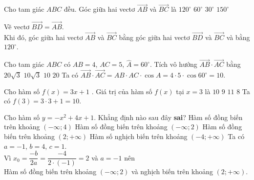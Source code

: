 \begin{ex}%
Cho tam giác $ABC$ đều. Góc giữa hai vectơ $\overrightarrow{AB}$ và $\overrightarrow{BC}$ là
\choice
{\True $120^\circ$}
{$60^\circ$}
{$30^\circ$}
{$150^\circ$}
\loigiai
{\begin{center}
\end{center}
Vẽ vectơ $\overrightarrow{BD}=\overrightarrow{AB}$.\\
Khi đó, góc giữa hai vectơ $\overrightarrow{AB}$ và $\overrightarrow{BC}$ bằng góc giữa hai vectơ $\overrightarrow{BD}$ và $\overrightarrow{BC}$ và bằng $120^\circ$.}
\end{ex}

\begin{ex}%
Cho tam giác $ABC$ có $AB=4$, $AC=5$, $\widehat{A}=60^\circ$. Tích vô hướng $\overrightarrow{AB}\cdot \overrightarrow{AC}$ bằng
\choice
{$20\sqrt{3}$}
{$10\sqrt{3}$}
{\True $10$}
{$20$}
\loigiai
{Ta có $\overrightarrow{AB}\cdot\overrightarrow{AC}=AB\cdot AC\cdot \cos A=4 \cdot 5 \cdot \cos 60^\circ=10$.}
\end{ex}

\begin{ex}%
Cho hàm số $f(x)=3x+1$ . Giá trị của hàm số $f(x)$ tại $x=3$ là
\choice
{\True $10$}
{$9$}
{$11$}
{$8$}
\loigiai
{Ta có $f(3)=3\cdot 3+1=10$.}
\end{ex}

\begin{ex}%
Cho hàm số $y=-x^2+4x+1$. Khẳng định nào sau đây \textbf{sai}?
\choice
{Hàm số đồng biến trên khoảng $(-\infty;4)$}
{\True Hàm số đồng biến trên khoảng $(-\infty;2)$}
{Hàm số đồng biến trên khoảng $(2;+\infty)$}
{Hàm số nghịch biến trên khoảng $(-4;+\infty)$}
\loigiai
{Ta có $a=-1$, $b=4$, $c=1$.\\
Vì $x_0=\dfrac {-b}{2a}=\dfrac {-4}{2\cdot (-1)}=2$ và $a=-1$ nên \\
Hàm số đồng biến trên khoảng $(-\infty;2)$ và nghịch biến trên khoảng $(2;+\infty)$.}
\end{ex}

